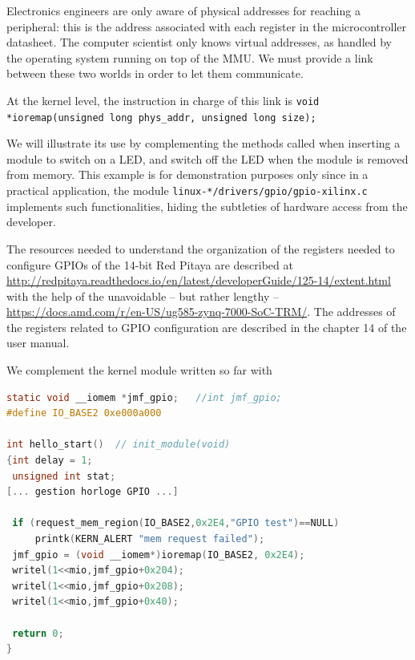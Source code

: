 \documentclass{article}
\begin{document}
{{{Electronics engineers are only aware of physical addresses for reaching a peripheral: this is
the address associated with each register in the microcontroller datasheet. The computer
scientist only knows virtual addresses, as handled by the operating system running on top of the
MMU. We must provide a link between these two worlds in order to let them communicate.

At the kernel level, the instruction \cite[chap.9]{ldd3} in charge of this link is
{\tt void *ioremap(unsigned long phys\_addr, unsigned long size);}

We will illustrate its use by complementing the methods called when inserting a module
to switch on a LED, and switch off the LED when the module is removed from memory. This example
is for demonstration purposes only since in a practical application, the module
{\tt linux-*/drivers/gpio/gpio-xilinx.c} implements such functionalities, hiding the subtleties
of hardware access from the developer.

The resources needed to understand the organization of the registers needed to configure
GPIOs of the 14-bit Red Pitaya are described at
\url{http://redpitaya.readthedocs.io/en/latest/developerGuide/125-14/extent.html}
with the help of the unavoidable -- but rather lengthy -- 
\url{https://docs.amd.com/r/en-US/ug585-zynq-7000-SoC-TRM/}.
The addresses of the registers related to GPIO configuration are described in the chapter 14
of the user manual.

We complement the kernel module written so far with
\begin{lstlisting}[language=C]
static void __iomem *jmf_gpio;   //int jmf_gpio;
#define IO_BASE2 0xe000a000

int hello_start()  // init_module(void) 
{int delay = 1;
 unsigned int stat;
[... gestion horloge GPIO ...]

 if (request_mem_region(IO_BASE2,0x2E4,"GPIO test")==NULL)
     printk(KERN_ALERT "mem request failed");
 jmf_gpio = (void __iomem*)ioremap(IO_BASE2, 0x2E4);
 writel(1<<mio,jmf_gpio+0x204);
 writel(1<<mio,jmf_gpio+0x208);
 writel(1<<mio,jmf_gpio+0x40);

 return 0;
}


\end{lstlisting}}}}
\end{document}
